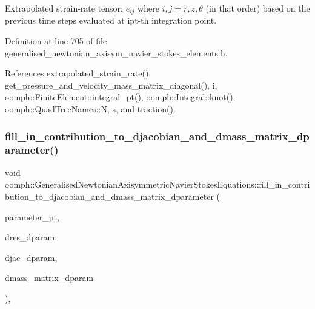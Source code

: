 Extrapolated strain-\/rate tensor\+: $ e_{ij} $ where $ i,j = r,z,\theta $ (in that order) based on the previous time steps evaluated at ipt-\/th integration point. 



Definition at line 705 of file generalised\+\_\+newtonian\+\_\+axisym\+\_\+navier\+\_\+stokes\+\_\+elements.\+h.



References extrapolated\+\_\+strain\+\_\+rate(), get\+\_\+pressure\+\_\+and\+\_\+velocity\+\_\+mass\+\_\+matrix\+\_\+diagonal(), i, oomph\+::\+Finite\+Element\+::integral\+\_\+pt(), oomph\+::\+Integral\+::knot(), oomph\+::\+Quad\+Tree\+Names\+::N, s, and traction().

\mbox{\label{classoomph_1_1GeneralisedNewtonianAxisymmetricNavierStokesEquations_a1456ce3e18f58d639fb29fb51f5f6a68}} 
\subsubsection{\texorpdfstring{fill\+\_\+in\+\_\+contribution\+\_\+to\+\_\+djacobian\+\_\+and\+\_\+dmass\+\_\+matrix\+\_\+dparameter()}{fill\_in\_contribution\_to\_djacobian\_and\_dmass\_matrix\_dparameter()}}
{\footnotesize\ttfamily void oomph\+::\+Generalised\+Newtonian\+Axisymmetric\+Navier\+Stokes\+Equations\+::fill\+\_\+in\+\_\+contribution\+\_\+to\+\_\+djacobian\+\_\+and\+\_\+dmass\+\_\+matrix\+\_\+dparameter (\begin{DoxyParamCaption}\item[{double $\ast$const \&}]{parameter\+\_\+pt,  }\item[{\hyperlink{classoomph_1_1Vector}{Vector}$<$ double $>$ \&}]{dres\+\_\+dparam,  }\item[{\hyperlink{classoomph_1_1DenseMatrix}{Dense\+Matrix}$<$ double $>$ \&}]{djac\+\_\+dparam,  }\item[{\hyperlink{classoomph_1_1DenseMatrix}{Dense\+Matrix}$<$ double $>$ \&}]{dmass\+\_\+matrix\+\_\+dparam }\end{DoxyParamCaption})\hspace{0.3cm}{\ttfamily [inline]}, {\ttfamily [virtual]}}

